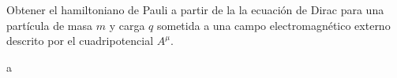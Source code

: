 Obtener el hamiltoniano de Pauli a partir de la la ecuación de Dirac para una partícula de masa $m$ y carga $q$ sometida a una campo electromagnético externo descrito por el cuadripotencial $A^\mu$.

\begin{solution}
a
\end{solution}